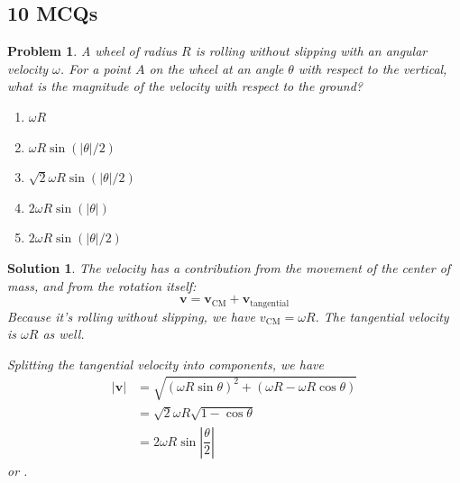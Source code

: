 \documentclass[12pt]{article}
\newcommand{\clearpts}{\addtocounter{tpts}{\value{cpts}} \setcounter{cpts}{0}}
\newcommand{\pts}[1]{\clearpts \setcounter{cpts}{#1}}
\newtheorem*{solution}{Solution}
\theoremstyle{mystyle}
\newtheorem{pproblem}{Problem}
\begin{document}
\newpage

\subsection*{10 MCQs}
\pts{2}
\begin{pproblem}
    A wheel of radius $R$ is rolling without slipping with an angular velocity
    $\omega$. For a point $A$ on the wheel at an angle $\theta$ with respect
    to the vertical, what is the magnitude of the velocity with respect
    to the ground?

    \begin{figure}[H]
        \centering
    \end{figure}
    \begin{enumerate}[label=(\Alph*)]
        \item $\omega R$
        \item $\omega R\sin(\left|\theta\right|/2)$
        \item $\sqrt{2}\omega R\sin(\left|\theta\right|/2)$
        \item $2\omega R\sin(\left|\theta\right|)$
        \item $2\omega R\sin(\left|\theta\right|/2)$
    \end{enumerate}
\end{pproblem}
\begin{solution}
    The velocity has a contribution from the movement of the center of mass, and 
    from the rotation itself: \[
        \mathbf{v}=\mathbf{v}_\mathrm{CM}+\mathbf{v}_\mathrm{tangential}
    \]
    Because it's rolling without slipping, we have
    $v_\mathrm{CM}=\omega R$. The tangential velocity is $\omega R$ as well.
    
    Splitting the tangential velocity into components, we have
    \begin{align*}
        \left\vert\mathbf{v}\right\vert &= \sqrt{(\omega R\sin\theta)^2+(\omega R-\omega R\cos\theta)}\\
        &=\sqrt{2}\omega R\sqrt{1-\cos\theta}\\
        &=2\omega R\sin\left\vert\dfrac{\theta}{2}\right\vert
    \end{align*}
    or .
\end{solution}
\end{document}
